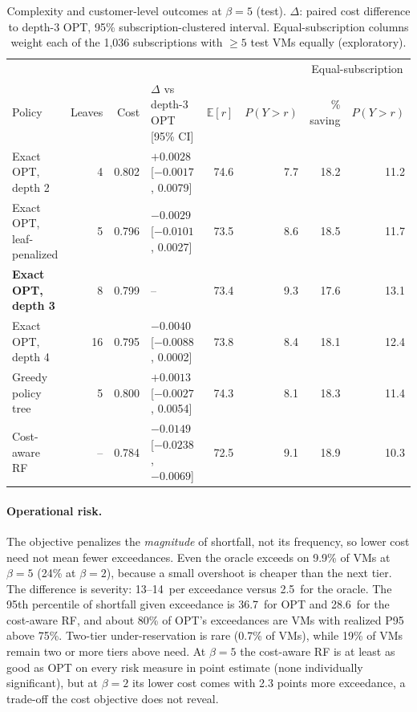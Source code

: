 \documentclass[10pt]{article}
\newcommand{\Ex}{\mathbb{E}}
\newcommand{\pp}{\,\text{pp}}
\begin{document}
\begin{table}[t]
\centering\small
\caption{Complexity and customer-level outcomes at $\beta=5$ (test). $\Delta$: paired cost difference to depth-3 OPT, 95\% subscription-clustered interval. Equal-subscription columns weight each of the 1,036 subscriptions with $\ge5$ test VMs equally (exploratory).}
\label{tab:complex}
\setlength{\tabcolsep}{4pt}
\begin{tabular}{lrrlrr|rr}
\toprule
 & & & & & & \multicolumn{2}{c}{Equal-subscription} \\
Policy & Leaves & Cost & $\Delta$ vs depth-3 OPT [95\% CI] & $\Ex[r]$ & $P(Y{>}r)$ & \% saving & $P(Y{>}r)$ \\
\midrule
Exact OPT, depth 2 & 4 & 0.802 & $+0.0028$ [$-0.0017$, 0.0079] & 74.6 & 7.7 & 18.2 & 11.2 \\
Exact OPT, leaf-penalized & 5 & 0.796 & $-0.0029$ [$-0.0101$, 0.0027] & 73.5 & 8.6 & 18.5 & 11.7 \\
\textbf{Exact OPT, depth 3} & 8 & 0.799 & -- & 73.4 & 9.3 & 17.6 & 13.1 \\
Exact OPT, depth 4 & 16 & 0.795 & $-0.0040$ [$-0.0088$, 0.0002] & 73.8 & 8.4 & 18.1 & 12.4 \\
Greedy policy tree & 5 & 0.800 & $+0.0013$ [$-0.0027$, 0.0054] & 74.3 & 8.1 & 18.3 & 11.4 \\
Cost-aware RF & -- & 0.784 & $-0.0149$ [$-0.0238$, $-0.0069$] & 72.5 & 9.1 & 18.9 & 10.3 \\
\bottomrule
\end{tabular}
\vspace{-0.5em}
\end{table}

\paragraph{Operational risk.} The objective penalizes the \emph{magnitude} of shortfall, not its frequency, so lower cost need not mean fewer exceedances. Even the oracle exceeds on 9.9\% of VMs at $\beta=5$ (24\% at $\beta=2$), because a small overshoot is cheaper than the next tier. The difference is severity: 13--14\pp{} per exceedance versus 2.5\pp{} for the oracle. The 95th percentile of shortfall given exceedance is 36.7\pp{} for OPT and 28.6\pp{} for the cost-aware RF, and about 80\% of OPT's exceedances are VMs with realized P95 above 75\%. Two-tier under-reservation is rare (0.7\% of VMs), while 19\% of VMs remain two or more tiers above need. At $\beta=5$ the cost-aware RF is at least as good as OPT on every risk measure in point estimate (none individually significant), but at $\beta=2$ its lower cost comes with 2.3 points more exceedance, a trade-off the cost objective does not reveal.
\end{document}
